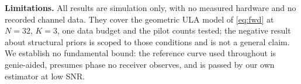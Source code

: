 \documentclass[journal]{IEEEtran}
\begin{document}
\textbf{Limitations.} All results are simulation only, with no measured
hardware and no recorded channel data. They cover the geometric ULA model of
\eqref{eq:fwd} at $N=32$, $K=3$, one data budget and the pilot counts tested;
the negative result about structural priors is scoped to those conditions and
is not a general claim. We establish no fundamental bound: the reference curve
used throughout is genie-aided, presumes phase no receiver observes, and is
passed by our own estimator at low SNR.



\end{document}
